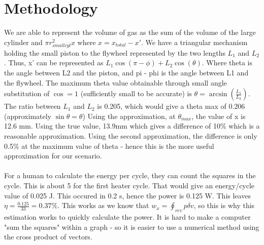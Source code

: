 \documentclass[12pt]{article}
\begin{document}
    \section{Methodology}
        We are able to represent the volume of gas as the sum of the volume of the large cylinder and $\pi r_{smallcyl}^2x$ where $x = x_{total} - x'$. We have a triangular
        mechanism holding the small piston to the flywheel represented by the two lengths $L_1$ and $L_2$. Thus, x' can be represented as $L_1 \cos (\pi - \phi) + L_2 \cos(\theta)$.
        Where theta is the angle between L2 and the piston, and pi - phi is the angle between L1 and the flywheel. The maximum theta value obtainable through small angle substitution
        of $\cos = 1$ (sufficiently small to be accurate) is $\theta = \arcsin(\frac{L_1}{L_2})$. The ratio  between $L_1$ and $L_2$ is 0.205, which would give a theta max of 0.206 (approximately $\sin \theta = \theta$)
        Using the approximation, at $\theta_{max}$, the value of x is 12.6 mm. Using the true value, 13.9mm which gives a difference of 10\% which is a reasonable approximation. Using
        the second approximation, the difference is only 0.5\% at the maximum value of theta - hence this is the more useful approximation for our scenario. \\ \\

        For a human to calculate the energy per cycle, they can count the squares in the cycle. This is about 5 for the first heater cycle. That would give an energy/cycle value
        of 0.025 J. This occured in 0.2 s, hence the power is 0.125 W. This leaves $\eta = \frac{0.125}{33} = 0.37 \%$. This works as we know that $w_x = \oint_{rev} p \delta v$, so this
        is why this estimation works to quickly calculate the power. It is hard to make a computer "sum the squares" within a graph - so it is easier to use a numerical method using
        the cross product of vectors.
\end{document}
